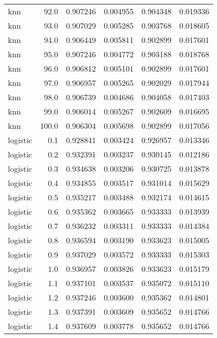 \begin{tabular}{lrrrrr}
     knn &       92.0 &    0.907246 &   0.004955 &   0.904348 &  0.019336 \\
     knn &       93.0 &    0.907029 &   0.005285 &   0.903768 &  0.018605 \\
     knn &       94.0 &    0.906449 &   0.005811 &   0.902899 &  0.017601 \\
     knn &       95.0 &    0.907246 &   0.004772 &   0.903188 &  0.018768 \\
     knn &       96.0 &    0.906812 &   0.005101 &   0.902899 &  0.017601 \\
     knn &       97.0 &    0.906957 &   0.005265 &   0.902029 &  0.017944 \\
     knn &       98.0 &    0.906739 &   0.004686 &   0.904058 &  0.017403 \\
     knn &       99.0 &    0.906014 &   0.005267 &   0.902609 &  0.016695 \\
     knn &      100.0 &    0.906304 &   0.005698 &   0.902899 &  0.017056 \\
logistic &        0.1 &    0.928841 &   0.003424 &   0.926957 &  0.013346 \\
logistic &        0.2 &    0.932391 &   0.003237 &   0.930145 &  0.012186 \\
logistic &        0.3 &    0.934638 &   0.003206 &   0.930725 &  0.013878 \\
logistic &        0.4 &    0.934855 &   0.003517 &   0.931014 &  0.015629 \\
logistic &        0.5 &    0.935217 &   0.003488 &   0.932174 &  0.014615 \\
logistic &        0.6 &    0.935362 &   0.003665 &   0.933333 &  0.013939 \\
logistic &        0.7 &    0.936232 &   0.003311 &   0.933333 &  0.014384 \\
logistic &        0.8 &    0.936594 &   0.003190 &   0.933623 &  0.015005 \\
logistic &        0.9 &    0.937029 &   0.003572 &   0.933333 &  0.015303 \\
logistic &        1.0 &    0.936957 &   0.003826 &   0.933623 &  0.015179 \\
logistic &        1.1 &    0.937101 &   0.003537 &   0.935072 &  0.015110 \\
logistic &        1.2 &    0.937246 &   0.003600 &   0.935362 &  0.014801 \\
logistic &        1.3 &    0.937391 &   0.003609 &   0.935652 &  0.014766 \\
logistic &        1.4 &    0.937609 &   0.003778 &   0.935652 &  0.014766 \\

\end{tabular}
